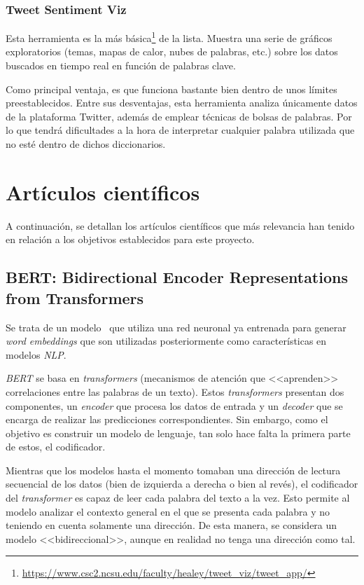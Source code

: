 \subsubsection{Tweet Sentiment Viz}

Esta herramienta es la más básica\footnote{\url{https://www.csc2.ncsu.edu/faculty/healey/tweet_viz/tweet_app/}} de la lista. Muestra una serie de gráficos exploratorios (temas, mapas de calor, nubes de palabras, etc.) sobre los datos buscados en tiempo real en función de palabras clave.

Como principal ventaja, es que funciona bastante bien dentro de unos límites preestablecidos. Entre sus desventajas, esta herramienta analiza únicamente datos de la plataforma Twitter, además de emplear técnicas de bolsas de palabras. Por lo que tendrá dificultades a la hora de interpretar cualquier palabra utilizada que no esté dentro de dichos diccionarios.

\section{Artículos científicos}

A continuación, se detallan los artículos científicos que más relevancia han tenido en relación a los objetivos establecidos para este proyecto.

\subsection{BERT: Bidirectional Encoder Representations from Transformers}

Se trata de un modelo~\cite{devlin2019bert} que utiliza una red neuronal ya entrenada para generar \textit{word embeddings} que son utilizadas posteriormente como características en modelos \textit{NLP}.

\textit{BERT} se basa en \textit{transformers} (mecanismos de atención que <<aprenden>> correlaciones entre las palabras de un texto). Estos \textit{transformers} presentan dos componentes, un \textit{encoder} que procesa los datos de entrada y un \textit{decoder} que se encarga de realizar las predicciones correspondientes. Sin embargo, como el objetivo es construir un modelo de lenguaje, tan solo hace falta la primera parte de estos, el codificador.

Mientras que los modelos hasta el momento tomaban una dirección de lectura secuencial de los datos (bien de izquierda a derecha o bien al revés), el codificador del \textit{transformer} es capaz de leer cada palabra del texto a la vez. Esto permite al modelo analizar el contexto general en el que se presenta cada palabra y no teniendo en cuenta solamente una dirección. De esta manera, se considera un modelo <<bidireccional>>, aunque en realidad no tenga una dirección como tal.

